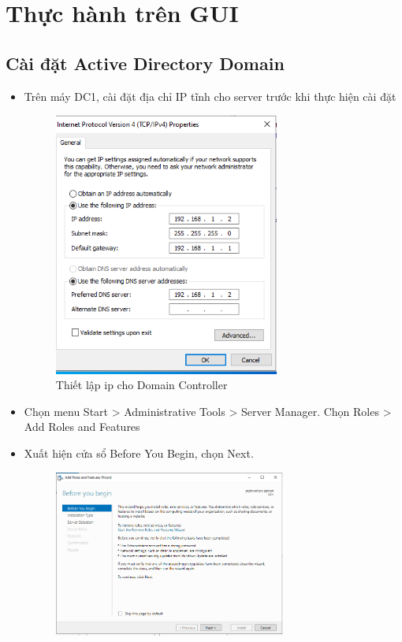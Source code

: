 \documentclass[13pt]{report}
\begin{document}
	\section{Thực hành trên GUI}
	\subsection{Cài đặt Active Directory Domain}
	\begin{itemize}
		\item Trên máy DC1, cài đặt địa chỉ IP tĩnh cho server trước khi thực hiện cài đặt	
		\begin{figure}[htp]
			\centering
			\includegraphics[width=0.7\textwidth]{image/Gui/ADDC/0.png}	
			\caption{Thiết lập ip cho Domain Controller}
			\label{refhinh1}
		\end{figure}
		\item Chọn menu Start > Administrative Tools > Server Manager. Chọn Roles > Add Roles and Features
		\newpage
		\item Xuất hiện cửa sổ Before You Begin, chọn Next.
		\begin{figure}[htp]
			\centering
			\includegraphics[width=0.72\textwidth]{image/Gui/ADDC/2.png}

\end{figure}
\end{itemize}
\end{document}
